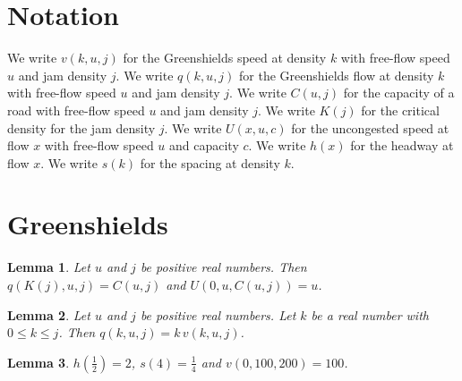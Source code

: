 \documentclass{article}
\newtheorem{lemma}{Lemma}
\begin{document}
\section{Notation}

We write $v(k,u,j)$ for the Greenshields speed at density $k$ with free-flow speed $u$ and jam density $j$.
We write $q(k,u,j)$ for the Greenshields flow at density $k$ with free-flow speed $u$ and jam density $j$.
We write $C(u,j)$ for the capacity of a road with free-flow speed $u$ and jam density $j$.
We write $K(j)$ for the critical density for the jam density $j$.
We write $U(x,u,c)$ for the uncongested speed at flow $x$ with free-flow speed $u$ and capacity $c$.
We write $h(x)$ for the headway at flow $x$.
We write $s(k)$ for the spacing at density $k$.

\section{Greenshields}

\begin{lemma}\label{capacity}
Let $u$ and $j$ be positive real numbers. Then $q(K(j),u,j)=C(u,j)$ and $U(0,u,C(u,j))=u$.
\end{lemma}

\begin{lemma}\label{flow}
Let $u$ and $j$ be positive real numbers. Let $k$ be a real number with $0\le k\le j$. Then $q(k,u,j)=k\,v(k,u,j)$.
\end{lemma}

\begin{lemma}\label{values}
$h(\frac12)=2$, $s(4)=\frac14$ and $v(0,100,200)=100$.
\end{lemma}
\end{document}
